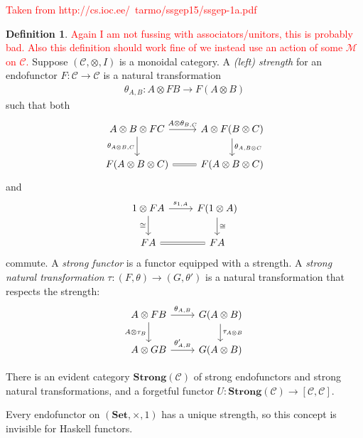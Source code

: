 \documentclass[11pt,a4paper]{article}
\theoremstyle{plain}
\theoremstyle{definition}
\newtheorem{definition}[theorem]{Definition}
\newcommand{\C}{\mathscr{C}}
\newcommand{\M}{\mathscr{M}}
\newcommand{\Set}{\mathbf{Set}}
\newcommand{\Strong}{\mathbf{Strong}}
\newcommand{\todo}[1]{\textcolor{red}{\small #1}}
\begin{document}
\todo{Taken from http://cs.ioc.ee/~tarmo/ssgep15/ssgep-1a.pdf}
\begin{definition}
\todo{Again I am not fussing with associators/unitors, this is probably bad. Also this definition should work fine of we instead use an action of some $\M$ on $\C$.} Suppose $(\C, \otimes, I)$ is a monoidal category. A \emph{(left) strength} for an endofunctor $F : \C \to \C$ is a natural transformation
\begin{align*}
\theta_{A,B} : A \otimes F B \to F(A \otimes B)
\end{align*}
such that both
\[
\begin{tikzcd}
A \otimes B \otimes F C \ar[r, "A \otimes \theta_{B,C}"] \ar[d, "\theta_{A \otimes B, C}" left]  & A \otimes F(B\otimes C) \ar[d, "\theta_{A, B\otimes C}" right] \\
F(A \otimes B \otimes C) \ar[r, equals]& F(A \otimes B \otimes C)
\end{tikzcd}
\]
and
\[
\begin{tikzcd}
1 \otimes F A \ar[r, "s_{1,A}"] \ar[d, "\cong" left]  & F(1 \otimes A) \ar[d, "\cong" right] \\
F A \ar[r, equals] & F A
\end{tikzcd}
\]
commute. A \emph{strong functor} is a functor equipped with a strength. A \emph{strong natural transformation} $\tau : (F,\theta) \to (G,\theta')$ is a natural transformation that respects the strength:
\[
\begin{tikzcd}
A \otimes F B \ar[r, "\theta_{A,B}"] \ar[d, "A \otimes \tau_B" left]  & G(A \otimes B) \ar[d, "\tau_{A \otimes B}" right] \\
A \otimes G B \ar[r, "\theta'_{A, B}"]& G(A \otimes B)
\end{tikzcd}
\]

There is an evident category $\Strong(\C)$ of strong endofunctors and strong natural transformations, and a forgetful functor $U : \Strong(\C) \to [\C, \C]$.
\end{definition}

Every endofunctor on $(\Set, \times, 1)$ has a unique strength, so this concept is invisible for Haskell functors.
\end{document}
